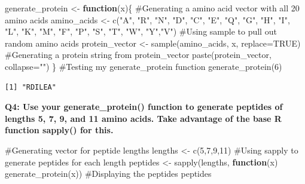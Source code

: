 \documentclass[
  letterpaper,
  DIV=11,
  numbers=noendperiod]{scrartcl}
\newenvironment{Shaded}{\begin{snugshade}}{\end{snugshade}}
\newcommand{\AttributeTok}[1]{\textcolor[rgb]{0.40,0.45,0.13}{#1}}
\newcommand{\CommentTok}[1]{\textcolor[rgb]{0.37,0.37,0.37}{#1}}
\newcommand{\ConstantTok}[1]{\textcolor[rgb]{0.56,0.35,0.01}{#1}}
\newcommand{\ControlFlowTok}[1]{\textcolor[rgb]{0.00,0.23,0.31}{\textbf{#1}}}
\newcommand{\DecValTok}[1]{\textcolor[rgb]{0.68,0.00,0.00}{#1}}
\newcommand{\FunctionTok}[1]{\textcolor[rgb]{0.28,0.35,0.67}{#1}}
\newcommand{\NormalTok}[1]{\textcolor[rgb]{0.00,0.23,0.31}{#1}}
\newcommand{\OtherTok}[1]{\textcolor[rgb]{0.00,0.23,0.31}{#1}}
\newcommand{\StringTok}[1]{\textcolor[rgb]{0.13,0.47,0.30}{#1}}
\begin{document}
\begin{Shaded}
\begin{Highlighting}[]
\NormalTok{generate\_protein }\OtherTok{\textless{}{-}} \ControlFlowTok{function}\NormalTok{(x)\{}
  \CommentTok{\#Generating a amino acid vector with all 20 amino acids}
\NormalTok{  amino\_acids }\OtherTok{\textless{}{-}} \FunctionTok{c}\NormalTok{(}\StringTok{"A"}\NormalTok{, }\StringTok{"R"}\NormalTok{, }\StringTok{"N"}\NormalTok{, }\StringTok{"D"}\NormalTok{, }\StringTok{"C"}\NormalTok{, }\StringTok{"E"}\NormalTok{, }\StringTok{"Q"}\NormalTok{, }\StringTok{"G"}\NormalTok{, }\StringTok{"H"}\NormalTok{, }\StringTok{"I"}\NormalTok{, }\StringTok{"L"}\NormalTok{, }\StringTok{"K"}\NormalTok{, }\StringTok{"M"}\NormalTok{, }\StringTok{"F"}\NormalTok{, }\StringTok{"P"}\NormalTok{, }\StringTok{"S"}\NormalTok{, }\StringTok{"T"}\NormalTok{, }\StringTok{"W"}\NormalTok{, }\StringTok{"Y"}\NormalTok{,}\StringTok{"V"}\NormalTok{)}
  \CommentTok{\#Using sample to pull out random amino acids}
\NormalTok{  protein\_vector }\OtherTok{\textless{}{-}} \FunctionTok{sample}\NormalTok{(amino\_acids, x, }\AttributeTok{replace=}\ConstantTok{TRUE}\NormalTok{)}
  \CommentTok{\#Generating a protein string from protein\_vector}
  \FunctionTok{paste}\NormalTok{(protein\_vector, }\AttributeTok{collapse=}\StringTok{""}\NormalTok{)}
\NormalTok{\}}
\CommentTok{\#Testing my generate\_protein function}
\FunctionTok{generate\_protein}\NormalTok{(}\DecValTok{6}\NormalTok{)}
\end{Highlighting}
\end{Shaded}

\begin{verbatim}
[1] "RDILEA"
\end{verbatim}

\textbf{Q4: Use your generate\_protein() function to generate peptides
of lengths 5, 7, 9, and 11 amino acids. Take advantage of the base R
function sapply() for this.}

\begin{Shaded}
\begin{Highlighting}[]
\CommentTok{\#Generating vector for peptide lengths}
\NormalTok{lengths }\OtherTok{\textless{}{-}} \FunctionTok{c}\NormalTok{(}\DecValTok{5}\NormalTok{,}\DecValTok{7}\NormalTok{,}\DecValTok{9}\NormalTok{,}\DecValTok{11}\NormalTok{)}
\CommentTok{\#Using sapply to generate peptides for each length}
\NormalTok{peptides }\OtherTok{\textless{}{-}} \FunctionTok{sapply}\NormalTok{(lengths, }\ControlFlowTok{function}\NormalTok{(x) }\FunctionTok{generate\_protein}\NormalTok{(x))}
\CommentTok{\#Displaying the peptides}
\NormalTok{peptides}
\end{Highlighting}
\end{Shaded}
\end{document}

